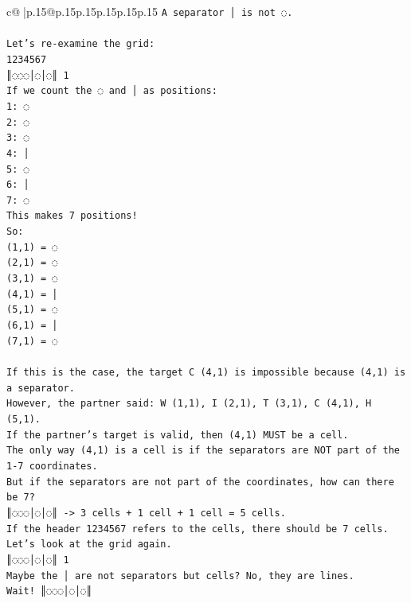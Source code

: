 \documentclass{article}
\begin{document}
{\begin{supertabular}{c@{$\;$}|p{.15\linewidth}@{}p{.15\linewidth}p{.15\linewidth}p{.15\linewidth}p{.15\linewidth}p{.15\linewidth}}
{{{\texttt{A separator │ is not ◌.} \\
\\ 
\texttt{Let's re{-}examine the grid:} \\
\texttt{1234567} \\
\texttt{║◌◌◌│◌│◌║ 1} \\
\texttt{If we count the ◌ and │ as positions:} \\
\texttt{1: ◌} \\
\texttt{2: ◌} \\
\texttt{3: ◌} \\
\texttt{4: │} \\
\texttt{5: ◌} \\
\texttt{6: │} \\
\texttt{7: ◌} \\
\texttt{This makes 7 positions!} \\
\texttt{So:} \\
\texttt{(1,1) = ◌} \\
\texttt{(2,1) = ◌} \\
\texttt{(3,1) = ◌} \\
\texttt{(4,1) = │} \\
\texttt{(5,1) = ◌} \\
\texttt{(6,1) = │} \\
\texttt{(7,1) = ◌} \\
\\ 
\texttt{If this is the case, the target C (4,1) is impossible because (4,1) is a separator.} \\
\texttt{However, the partner said: W (1,1), I (2,1), T (3,1), C (4,1), H (5,1).} \\
\texttt{If the partner's target is valid, then (4,1) MUST be a cell.} \\
\texttt{The only way (4,1) is a cell is if the separators are NOT part of the 1{-}7 coordinates.} \\
\texttt{But if the separators are not part of the coordinates, how can there be 7?} \\
\texttt{║◌◌◌│◌│◌║ {-}> 3 cells + 1 cell + 1 cell = 5 cells.} \\
\texttt{If the header 1234567 refers to the cells, there should be 7 cells.} \\
\texttt{Let's look at the grid again.} \\
\texttt{║◌◌◌│◌│◌║ 1} \\
\texttt{Maybe the │ are not separators but cells? No, they are lines.} \\
\texttt{Wait! ║◌◌◌│◌│◌║} \\
}}}
\end{supertabular}}
\end{document}
